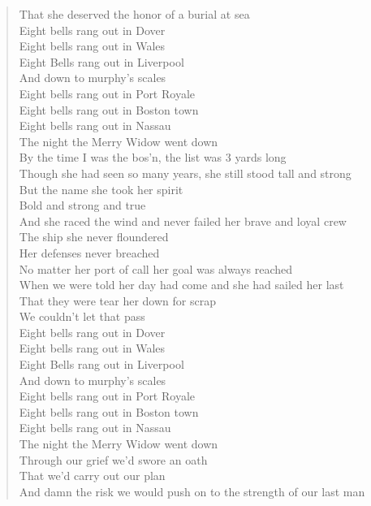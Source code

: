\documentclass[11pt]{article}
\begin{document}
\begin{verse}
That she deserved the honor of a burial at sea\\
\vspace*{1em}
Eight bells rang out in Dover\\
Eight bells rang out in Wales\\
Eight Bells rang out in Liverpool\\
And down to murphy's scales\\
Eight bells rang out in Port Royale\\
Eight bells rang out in Boston town\\
Eight bells rang out in Nassau\\
The night the Merry Widow went down\\
By the time I was the bos'n, the list was 3 yards long\\
Though she had seen so many years, she still stood tall and strong\\
But the name she took her spirit\\
Bold and strong and true\\
And she raced the wind and never failed her brave and loyal crew\\
\vspace*{1em}
The ship she never floundered\\
Her defenses never breached\\
No matter her port of call her goal was always reached\\
When we were told her day had come and she had sailed her last\\
That they were tear her down for scrap\\
We couldn't let that pass\\
\vspace*{1em}
Eight bells rang out in Dover\\
Eight bells rang out in Wales\\
Eight Bells rang out in Liverpool\\
And down to murphy's scales\\
Eight bells rang out in Port Royale\\
Eight bells rang out in Boston town\\
Eight bells rang out in Nassau\\
The night the Merry Widow went down\\
\vspace*{1em}
Through our grief we'd swore an oath\\
That we'd carry out our plan\\
And damn the risk we would push on to the strength of our last man\\

\end{verse}
\end{document}
